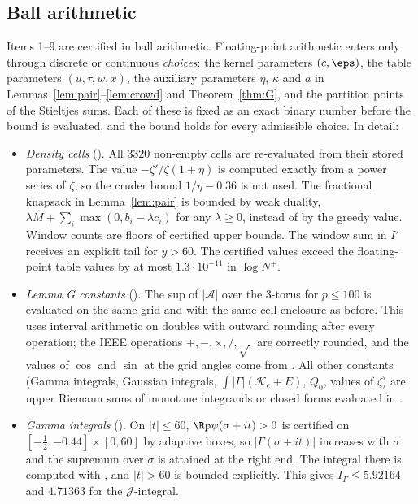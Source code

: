 \subsection{Ball arithmetic}\label{sec:ball}
Items 1--9 are certified in ball arithmetic.
Floating-point arithmetic enters only through discrete or continuous \emph{choices}: the kernel parameters $(c,\eps)$, the table parameters $(u,\tau,w,x)$, the auxiliary parameters $\eta$, $\kappa$ and $a$ in Lemmas~\ref{lem:pair}--\ref{lem:crowd} and Theorem~\ref{thm:G}, and the partition points of the Stieltjes sums.
Each of these is fixed as an exact binary number before the bound is evaluated, and the bound holds for every admissible choice.
In detail:
\begin{itemize}
\item \emph{Density cells} (). All $3320$ non-empty cells are re-evaluated from their stored parameters.
  The value $-\zeta'/\zeta(1+\eta)$ is computed exactly from a power series of $\zeta$, so the cruder bound $1/\eta - 0.36$ is not used.
  The fractional knapsack in Lemma~\ref{lem:pair} is bounded by weak duality, $\lambda M + \sum_i\max(0, b_i - \lambda c_i)$ for any $\lambda\ge0$, instead of by the greedy value.
  Window counts are floors of certified upper bounds.
  The window sum in $I'$ receives an explicit tail for $y > 60$.
  The certified values exceed the floating-point table values by at most $1.3\cdot10^{-11}$ in $\log N^+$.
\item \emph{Lemma G constants} (). The sup of $|\mathcal A|$ over the $3$-torus for $p \le 100$ is evaluated on the same grid and with the same cell enclosure as before.
  This uses interval arithmetic on doubles with outward rounding after every operation; the IEEE operations $+,-,\times,/,\sqrt{\ }$ are correctly rounded, and the values of $\cos$ and $\sin$ at the grid angles come from .
  All other constants (Gamma integrals, Gaussian integrals, $\int|\Gamma|(\mathcal K_c + E)$, $Q_0$, values of $\zeta$) are upper Riemann sums of monotone integrands or closed forms evaluated in .
\item \emph{Gamma integrals} (). On $|t| \le 60$, $\Rp\psi(\sigma+it) > 0$ is certified on $[-\frac12,-0.44]\times[0,60]$ by adaptive boxes, so $|\Gamma(\sigma+it)|$ increases with $\sigma$ and the supremum over $\sigma$ is attained at the right end.
  The integral there is computed with , and $|t| > 60$ is bounded explicitly.
  This gives $I_\Gamma \le 5.92164$ and $4.71363$ for the $\mathcal J$-integral.

\end{itemize}
